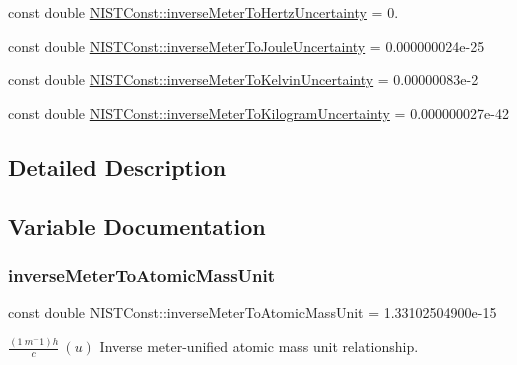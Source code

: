 \begin{DoxyCompactItemize}
\item 
const double \hyperlink{group___inverse_meter_ga96ba9736f99affda3bf53cb99bda10b0}{N\+I\+S\+T\+Const\+::inverse\+Meter\+To\+Hertz\+Uncertainty} = 0.
\item 
const double \hyperlink{group___inverse_meter_gae5a72bfc7da337d98e1df913d379cf66}{N\+I\+S\+T\+Const\+::inverse\+Meter\+To\+Joule\+Uncertainty} = 0.\+000000024e-\/25
\item 
const double \hyperlink{group___inverse_meter_gad0b83065f808c922edc87282db57f184}{N\+I\+S\+T\+Const\+::inverse\+Meter\+To\+Kelvin\+Uncertainty} = 0.\+00000083e-\/2
\item 
const double \hyperlink{group___inverse_meter_gaedbe76575234cd5252d6a4b2ef8db104}{N\+I\+S\+T\+Const\+::inverse\+Meter\+To\+Kilogram\+Uncertainty} = 0.\+000000027e-\/42
\end{DoxyCompactItemize}


\subsection{Detailed Description}


\subsection{Variable Documentation}
\mbox{\label{group___inverse_meter_ga7d76b1c26bd9b6226d0bdbcbfe44c3a0}} 
\subsubsection{\texorpdfstring{inverse\+Meter\+To\+Atomic\+Mass\+Unit}{inverseMeterToAtomicMassUnit}}
{\footnotesize\ttfamily const double N\+I\+S\+T\+Const\+::inverse\+Meter\+To\+Atomic\+Mass\+Unit = 1.\+33102504900e-\/15}

$\frac{(1\ m^-1)h}{c} \ (u)$ Inverse meter-\/unified atomic mass unit relationship. \mbox{\label{group___inverse_meter_ga19f65e8c675ab4bbf77f2d7fcc27dec8}} 

